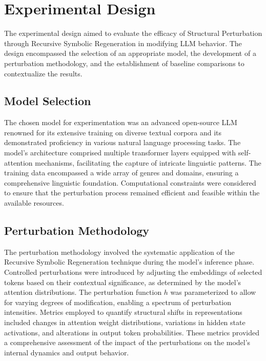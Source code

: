 \documentclass[5p,times]{elsarticle}
\begin{document}
\section{Experimental Design}

The experimental design aimed to evaluate the efficacy of Structural Perturbation through Recursive Symbolic Regeneration in modifying LLM behavior. The design encompassed the selection of an appropriate model, the development of a perturbation methodology, and the establishment of baseline comparisons to contextualize the results.

\subsection{Model Selection}

The chosen model for experimentation was an advanced open-source LLM renowned for its extensive training on diverse textual corpora and its demonstrated proficiency in various natural language processing tasks. The model's architecture comprised multiple transformer layers equipped with self-attention mechanisms, facilitating the capture of intricate linguistic patterns. The training data encompassed a wide array of genres and domains, ensuring a comprehensive linguistic foundation. Computational constraints were considered to ensure that the perturbation process remained efficient and feasible within the available resources.

\subsection{Perturbation Methodology}

The perturbation methodology involved the systematic application of the Recursive Symbolic Regeneration technique during the model's inference phase. Controlled perturbations were introduced by adjusting the embeddings of selected tokens based on their contextual significance, as determined by the model's attention distributions. The perturbation function \( h \) was parameterized to allow for varying degrees of modification, enabling a spectrum of perturbation intensities. Metrics employed to quantify structural shifts in representations included changes in attention weight distributions, variations in hidden state activations, and alterations in output token probabilities. These metrics provided a comprehensive assessment of the impact of the perturbations on the model's internal dynamics and output behavior.
\end{document}

